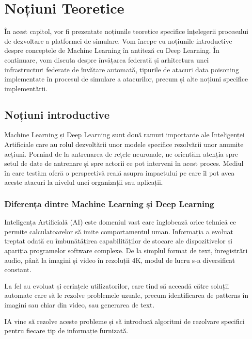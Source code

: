 \documentclass[../../main.tex]{subfiles}
\begin{document}
\chapter{Noțiuni Teoretice}

În acest capitol, vor fi prezentate noțiunile teoretice specifice înțelegerii procesului de dezvoltare a platformei de simulare.
Vom începe cu noțiunile introductive despre conceptele de Machine Learning în antiteză cu Deep Learning. În continuare, vom discuta despre învățarea federată și arhitectura unei infrastructuri federate de învățare automată, tipurile
de atacuri data poisoning implementate în procesul de simulare a atacurilor, precum și alte noțiuni specifice implementării.

    \section{Noțiuni introductive}

    Machine Learning și Deep Learning sunt două ramuri importante ale Inteligenței Artificiale care au rolul dezvoltării unor modele specifice rezolvării unor anumite
    acțiuni. Pornind de la antrenarea de rețele neuronale, ne orientăm atenția spre setul de date de antrenare și spre actorii ce pot interveni în acest proces.
    Mediul în care testăm oferă o perspectivă reală asupra impactului pe care îl pot avea aceste atacuri la nivelul unei organizații sau aplicații.

    \subsection{Diferența dintre Machine Learning și Deep Learning}

    Inteligența Artificială (AI) este domeniul vast care înglobează orice tehnică ce permite calculatoarelor să imite comportamentul uman.
Informația a evoluat treptat odată cu îmbunătățirea capabilităților de stocare ale dispozitivelor și apariția programelor software complexe.
De la simplul format de text, înregistrări audio, până la imagini și video în rezoluții 4K, modul de lucru s-a diversificat constant.

La fel au evoluat și cerințele utilizatorilor, care tind să acceadă către soluții automate care să le rezolve problemele uzuale,
precum identificarea de patterns în imagini sau chiar din video, sau generarea de text.

IA vine să rezolve aceste probleme și să introducă algoritmi de rezolvare specifici pentru fiecare tip de informație furnizată.
\end{document}
